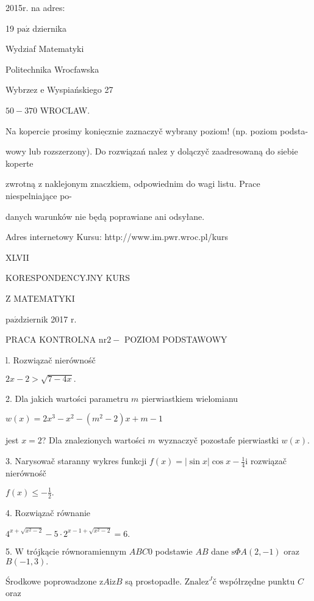 \documentclass[a4paper,12pt]{article}
\begin{document}
2015r. na adres:

19 $\mathrm{p}\mathrm{a}\acute{\mathrm{z}}$ dziernika

Wydziaf Matematyki

Politechnika Wrocfawska

Wybrzez $\mathrm{e}$ Wyspiańskiego 27

$50-370$ WROCLAW.

Na kopercie prosimy $\underline{\mathrm{k}\mathrm{o}\mathrm{n}\mathrm{i}\mathrm{e}\mathrm{c}\mathrm{z}\mathrm{n}\mathrm{i}\mathrm{e}}$ zaznaczyč wybrany poziom! (np. poziom podsta-

wowy lub rozszerzony). Do rozwiązań nalez $\mathrm{y}$ dolączyč zaadresowaną do siebie koperte

zwrotną $\mathrm{z}$ naklejonym znaczkiem, odpowiednim do wagi listu. Prace niespelniające po-

danych warunków nie będą poprawiane ani odsyłane.

Adres internetowy Kursu: http://www.im.pwr.wroc.pl/kurs







XLVII

KORESPONDENCYJNY KURS

Z MATEMATYKI

$\mathrm{p}\mathrm{a}\acute{\mathrm{z}}$dziernik 2017 $\mathrm{r}.$

PRACA KONTROLNA $\mathrm{n}\mathrm{r} 2-$ POZIOM PODSTAWOWY

l. Rozwiązač nierównośč

$2x-2>\sqrt{7-4x}.$

2. Dla jakich wartości parametru $m$ pierwiastkiem wielomianu

$w(x)=2x^{3}-x^{2}-(m^{2}-2)x+m-1$

jest $x=2$? Dla znalezionych wartości $m$ wyznaczyč pozostafe pierwiastki $w(x).$

3. Narysowač staranny wykres funkcji $f(x)=|\displaystyle \sin x|\cos x-\frac{1}{4}\mathrm{i}$ rozwiązač nierównośč

$f(x)\displaystyle \leq-\frac{1}{2}.$

4. Rozwiązač równanie

$4^{x+\sqrt{x^{2}-2}}-5\cdot 2^{x-1+\sqrt{x^{2}-2}}=6.$

5. $\mathrm{W}$ trójkącie równoramiennym $ABC0$ podstawie $AB$ dane $\mathrm{s}\Phi A(2,-1)$ oraz $B(-1,3).$

Środkowe poprowadzone $\mathrm{z}A\mathrm{i}\mathrm{z}B$ są prostopadłe. $\mathrm{Z}\mathrm{n}\mathrm{a}\mathrm{l}\mathrm{e}\mathrm{z}^{J}\text{č}$ współrzędne punktu $C$ oraz
\end{document}
